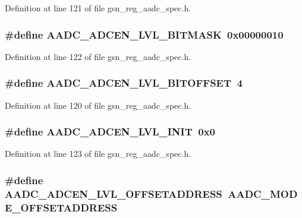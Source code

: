 Definition at line 121 of file gsn\_\-reg\_\-aadc\_\-spec.h.

\hypertarget{a00543_ae668d71d84d81bfec2617f04eaae8f23}{
\subsubsection[{AADC\_\-ADCEN\_\-LVL\_\-BITMASK}]{\setlength{\rightskip}{0pt plus 5cm}\#define AADC\_\-ADCEN\_\-LVL\_\-BITMASK~0x00000010}}
\label{a00543_ae668d71d84d81bfec2617f04eaae8f23}


Definition at line 122 of file gsn\_\-reg\_\-aadc\_\-spec.h.

\hypertarget{a00543_a3dce6d4b89c8e3d128c55250894c67bf}{
\subsubsection[{AADC\_\-ADCEN\_\-LVL\_\-BITOFFSET}]{\setlength{\rightskip}{0pt plus 5cm}\#define AADC\_\-ADCEN\_\-LVL\_\-BITOFFSET~4}}
\label{a00543_a3dce6d4b89c8e3d128c55250894c67bf}


Definition at line 120 of file gsn\_\-reg\_\-aadc\_\-spec.h.

\hypertarget{a00543_a070932e8fb07c354f4c7f6055f637d22}{
\subsubsection[{AADC\_\-ADCEN\_\-LVL\_\-INIT}]{\setlength{\rightskip}{0pt plus 5cm}\#define AADC\_\-ADCEN\_\-LVL\_\-INIT~0x0}}
\label{a00543_a070932e8fb07c354f4c7f6055f637d22}


Definition at line 123 of file gsn\_\-reg\_\-aadc\_\-spec.h.

\hypertarget{a00543_aff17255634a2290d80570913a256822b}{
\subsubsection[{AADC\_\-ADCEN\_\-LVL\_\-OFFSETADDRESS}]{\setlength{\rightskip}{0pt plus 5cm}\#define AADC\_\-ADCEN\_\-LVL\_\-OFFSETADDRESS~AADC\_\-MODE\_\-OFFSETADDRESS}}
\label{a00543_aff17255634a2290d80570913a256822b}


